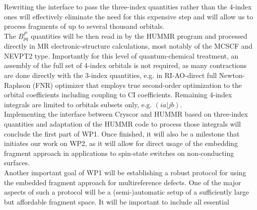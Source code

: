 \documentclass[a4paper,11pt,headings=normal]{scrartcl}
\begin{document}
Rewriting the interface to 
pass the three-index quantities rather than the 4-index ones will effectively 
eliminate the need for this expensive step and will allow us to process 
fragments of up to several thousand orbitals.\\
The $B^P_{pq}$ quantities will be then read in by the HUMMR program 
and processed directly in MR electronic-structure calculations, most notably of 
the MCSCF and NEVPT2 type. Importantly for this level of quantum-chemical 
treatment, an assembly of the full set of 4-index orbitals is not required, as 
many contractions are done directly with the 3-index quantities, e.g. in 
RI-AO-direct full Newton-Raphson (FNR) optimizer that employs true second-order 
optimization to the orbital coefficients including coupling to CI 
coefficients.\autocite{Roemelt2025} Remaining 4-index integrals are limited to 
orbitals subsets only, e.g. $(ia|jb)$.\\
Implementing the interface between Cryscor and HUMMR based on 
three-index quantities and adaptation of the HUMMR code to process those 
integrals will conclude the first part of WP1. Once finished, it will also be a 
milestone that initiates our work on WP2, as it will allow for direct usage of 
the embedding fragment 
approach in applications to spin-state switches on non-conducting surfaces.\\
Another important goal of WP1 will be establishing a robust protocol for using 
the embedded fragment approach for multireference defects. One of the major aspects of such a protocol 
will be a (semi-)automatic setup of a sufficiently large but affordable 
fragment space. It will be important to include all essential 
\end{document}
